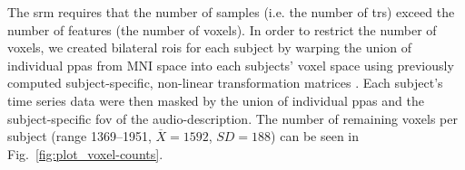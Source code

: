 






The \ac{srm} requires that the number of samples (i.e. the number of \acp{tr})
exceed the number of features (the number of voxels).
%
In order to restrict the number of voxels, we created bilateral \acp{roi} for
each subject by warping the union of individual \acp{ppa}
\citep[s.][]{haeusler2022processing} from MNI space into each subjects' voxel
space using previously computed subject-specific, non-linear transformation
matrices
\citep[][\href{https://github.com/psychoinformatics-de/studyforrest-data-templatetransforms
}{\url{github.com/psychoinformatics-de/studyforrest-data-templatetransforms}}]{hanke2014audiomovie}.
Each subject's time series data were then masked by the union of individual
\acp{ppa} and the subject-specific \ac{fov} of the audio-description.
The number of remaining voxels per subject (range 1369--1951,
$\overline{X}=1592$, $SD=188$) can be seen in Fig.~\ref{fig:plot_voxel-counts}.

